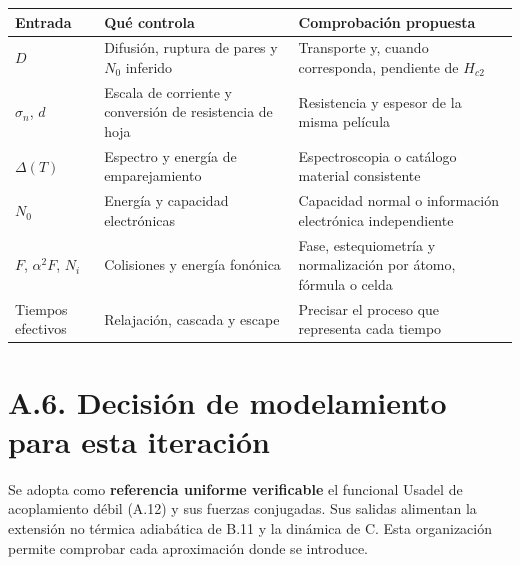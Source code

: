 \documentclass[
  spanish,
  10pt,
  a4paper,
]{article}
\newcounter{none} %
\begin{document}
{\def\LTcaptype{none} %
\begin{longtable}[]{@{}
  >{\raggedright\arraybackslash}p{}
  >{\raggedright\arraybackslash}p{}
  >{\raggedright\arraybackslash}p{}@{}}
\toprule\noalign{}
\begin{minipage}[b]{\linewidth}\raggedright
Entrada
\end{minipage} & \begin{minipage}[b]{\linewidth}\raggedright
Qué controla
\end{minipage} & \begin{minipage}[b]{\linewidth}\raggedright
Comprobación propuesta
\end{minipage} \\
\midrule\noalign{}
\endhead
\bottomrule\noalign{}
\endlastfoot
\(D\) & Difusión, ruptura de pares y \(N_0\) inferido & Transporte y,
cuando corresponda, pendiente de \(H_{c2}\) \\
\(\sigma_n\), \(d\) & Escala de corriente y conversión de resistencia de
hoja & Resistencia y espesor de la misma película \\
\(\Delta(T)\) & Espectro y energía de emparejamiento & Espectroscopia o
catálogo material consistente \\
\(N_0\) & Energía y capacidad electrónicas & Capacidad normal o
información electrónica independiente \\
\(F\), \(\alpha^2F\), \(N_i\) & Colisiones y energía fonónica & Fase,
estequiometría y normalización por átomo, fórmula o celda \\
Tiempos efectivos & Relajación, cascada y escape & Precisar el proceso
que representa cada tiempo \\
\end{longtable}
}

\section{A.6. Decisión de modelamiento para esta
iteración}\label{a.6.-decisiuxf3n-de-modelamiento-para-esta-iteraciuxf3n}

Se adopta como \textbf{referencia uniforme verificable} el funcional
Usadel de acoplamiento débil (A.12) y sus fuerzas conjugadas. Sus
salidas alimentan la extensión no térmica adiabática de B.11 y la
dinámica de C. Esta organización permite comprobar cada aproximación
donde se introduce.
\end{document}
